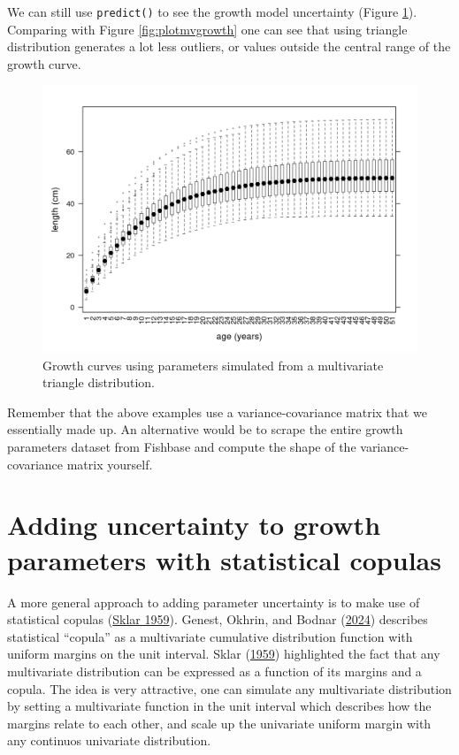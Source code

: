 \documentclass[
]{book}
\begin{document}
We can still use \texttt{predict()} to see the growth model uncertainty (Figure \ref{fig:plottrigrowth}). Comparing with Figure \ref{fig:plotmvgrowth} one can see that using triangle distribution generates a lot less outliers, or values outside the central range of the growth curve.

\begin{figure}
\centering
\includegraphics{_bookdown_files/_main_files/figure-html/plottrigrowth-1.png}
\caption{\label{fig:plottrigrowth}Growth curves using parameters simulated from a multivariate triangle distribution.}
\end{figure}

Remember that the above examples use a variance-covariance matrix that we essentially made up. An alternative would be to scrape the entire growth parameters dataset from Fishbase and compute the shape of the variance-covariance matrix yourself.

\hypertarget{adding-uncertainty-to-growth-parameters-with-statistical-copulas}{%
\section{Adding uncertainty to growth parameters with statistical copulas}\label{adding-uncertainty-to-growth-parameters-with-statistical-copulas}}

A more general approach to adding parameter uncertainty is to make use of statistical copulas (\protect\hyperlink{ref-sklar1959}{Sklar 1959}). Genest, Okhrin, and Bodnar (\protect\hyperlink{ref-copulahistory}{2024}) describes statistical ``copula'' as a multivariate cumulative distribution function with uniform margins on the unit interval. Sklar (\protect\hyperlink{ref-sklar1959}{1959}) highlighted the fact that any multivariate distribution can be expressed as a function of its margins and a copula. The idea is very attractive, one can simulate any multivariate distribution by setting a multivariate function in the unit interval which describes how the margins relate to each other, and scale up the univariate uniform margin with any continuos univariate distribution.
\end{document}
